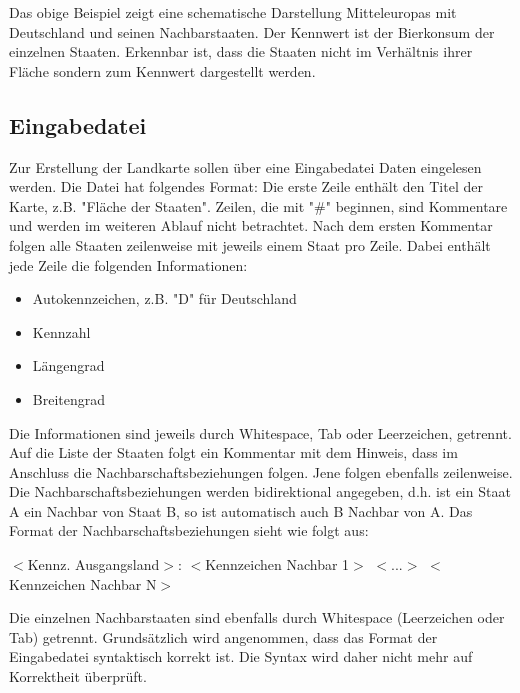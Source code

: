 \documentclass[a4paper,11pt]{article}
\begin{document}
{Das obige Beispiel zeigt eine schematische Darstellung Mitteleuropas mit Deutschland und seinen Nachbarstaaten. Der Kennwert ist der Bierkonsum der einzelnen Staaten. Erkennbar ist, dass die Staaten nicht im Verh\"altnis
ihrer Fl\"ache sondern zum Kennwert dargestellt werden.
\subsection{Eingabedatei}
Zur Erstellung der Landkarte sollen \"uber eine Eingabedatei Daten eingelesen werden. Die Datei hat folgendes Format:
Die erste Zeile enth\"alt den Titel der Karte, z.B. "Fl\"ache der Staaten".
Zeilen, die mit "\#" beginnen, sind Kommentare und werden im weiteren Ablauf nicht betrachtet.
Nach dem ersten Kommentar folgen alle Staaten zeilenweise mit jeweils einem Staat pro Zeile. Dabei enth\"alt jede Zeile die folgenden Informationen:
\begin{itemize}
\item Autokennzeichen, z.B. "D" f\"ur Deutschland
\item Kennzahl
\item L\"angengrad
\item Breitengrad
\end{itemize}
Die Informationen sind jeweils durch Whitespace, Tab oder Leerzeichen, getrennt.
Auf die Liste der Staaten folgt ein Kommentar mit dem Hinweis, dass im Anschluss die Nachbarschaftsbeziehungen folgen. Jene folgen ebenfalls zeilenweise.
Die Nachbarschaftsbeziehungen werden bidirektional angegeben, d.h. ist ein Staat A ein Nachbar von Staat B, so ist automatisch auch B Nachbar von A.
Das Format der Nachbarschaftsbeziehungen sieht wie folgt aus:
\begin{mdframed}[linewidth=0pt, backgroundcolor=background, innertopmargin=10pt, innerbottommargin=10pt]
$<$Kennz. Ausgangsland$>$: $<$Kennzeichen Nachbar 1$>$ $<$...$>$ $<$Kennzeichen Nachbar N$>$
\end{mdframed}
Die einzelnen Nachbarstaaten sind ebenfalls durch Whitespace (Leerzeichen oder Tab) getrennt. 
Grundsätzlich wird angenommen, dass das Format der Eingabedatei syntaktisch korrekt ist. Die Syntax wird daher nicht mehr auf Korrektheit \"uberpr\"uft.

\vspace{10mm}

}
\end{document}

